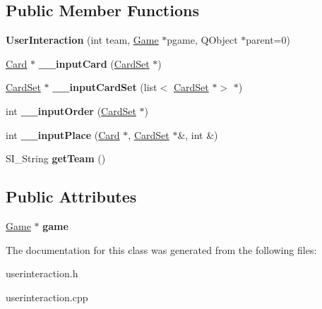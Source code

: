 \subsection*{Public Member Functions}
\begin{DoxyCompactItemize}
\item 
\mbox{\label{class_user_interaction_a4aeac47b93a4faf9bfc28e1a9c82ae31}} 
{\bfseries User\+Interaction} (int team, \hyperlink{class_game}{Game} $\ast$pgame, Q\+Object $\ast$parent=0)
\item 
\mbox{\label{class_user_interaction_a649516d648a3c6e06cf66b676ec57e0f}} 
\hyperlink{class_card}{Card} $\ast$ {\bfseries \+\_\+\+\_\+input\+Card} (\hyperlink{class_card_set}{Card\+Set} $\ast$)
\item 
\mbox{\label{class_user_interaction_a0c2e1a09df22e3980ddc62dd9af81441}} 
\hyperlink{class_card_set}{Card\+Set} $\ast$ {\bfseries \+\_\+\+\_\+input\+Card\+Set} (list$<$ \hyperlink{class_card_set}{Card\+Set} $\ast$$>$ $\ast$)
\item 
\mbox{\label{class_user_interaction_a5a7ad04bed1d90079e9995b5e3d43640}} 
int {\bfseries \+\_\+\+\_\+input\+Order} (\hyperlink{class_card_set}{Card\+Set} $\ast$)
\item 
\mbox{\label{class_user_interaction_a3e439e45021b61aadaeac96141591c94}} 
int {\bfseries \+\_\+\+\_\+input\+Place} (\hyperlink{class_card}{Card} $\ast$, \hyperlink{class_card_set}{Card\+Set} $\ast$\&, int \&)
\item 
\mbox{\label{class_user_interaction_a14cbffbf423eaa5c5ca9d12e2a0d3bc1}} 
S\+I\+\_\+\+String {\bfseries get\+Team} ()
\end{DoxyCompactItemize}
\subsection*{Public Attributes}
\begin{DoxyCompactItemize}
\item 
\mbox{\label{class_user_interaction_a6788061b735de7f1a86180b2fa4982c1}} 
\hyperlink{class_game}{Game} $\ast$ {\bfseries game}
\end{DoxyCompactItemize}


The documentation for this class was generated from the following files\+:\begin{DoxyCompactItemize}
\item 
userinteraction.\+h\item 
userinteraction.\+cpp\end{DoxyCompactItemize}
